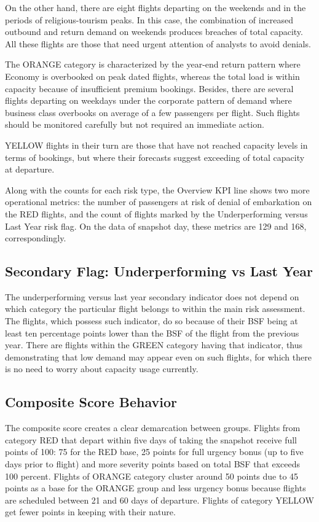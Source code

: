 On the other hand, there are eight flights departing on the weekends and in the periods of religious-tourism peaks. In this case, the combination of increased outbound and return demand on weekends produces breaches of total capacity. All these flights are those that need urgent attention of analysts to avoid denials.

The ORANGE category is characterized by the year-end return pattern where Economy is overbooked on peak dated flights, whereas the total load is within capacity because of insufficient premium bookings. Besides, there are several flights departing on weekdays under the corporate pattern of demand where business class overbooks on average of a few passengers per flight. Such flights should be monitored carefully but not required an immediate action.

YELLOW flights in their turn are those that have not reached capacity levels in terms of bookings, but where their forecasts suggest exceeding of total capacity at departure.

Along with the counts for each risk type, the Overview KPI line shows two more operational metrics: the number of passengers at risk of denial of embarkation on the RED flights, and the count of flights marked by the Underperforming versus Last Year risk flag. On the data of snapshot day, these metrics are 129 and 168, correspondingly.

\subsection{Secondary Flag: Underperforming vs Last Year}

The underperforming versus last year secondary indicator does not depend on which category the particular flight belongs to within the main risk assessment. The flights, which possess such indicator, do so because of their BSF being at least ten percentage points lower than the BSF of the flight from the previous year. There are flights within the GREEN category having that indicator, thus demonstrating that low demand may appear even on such flights, for which there is no need to worry about capacity usage currently.

\subsection{Composite Score Behavior}

The composite score creates a clear demarcation between groups. Flights from category RED that depart within five days of taking the snapshot receive full points of 100: 75 for the RED base, 25 points for full urgency bonus (up to five days prior to flight) and more severity points based on total BSF that exceeds 100 percent. Flights of ORANGE category cluster around 50 points due to 45 points as a base for the ORANGE group and less urgency bonus because flights are scheduled between 21 and 60 days of departure. Flights of category YELLOW get fewer points in keeping with their nature.

